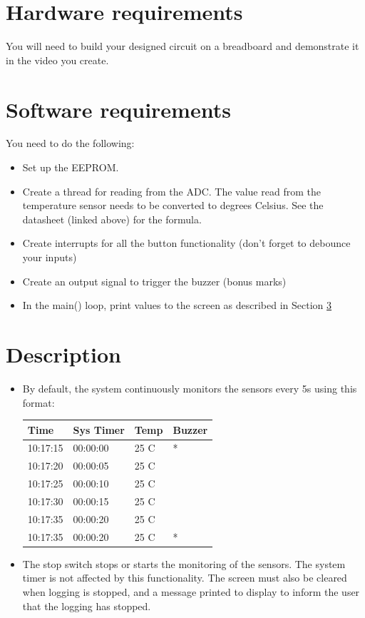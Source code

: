\section{Hardware requirements}
You will need to build your designed circuit on a breadboard and demonstrate it in the video you create.

\section{Software requirements}
You need to do the following:
\begin{itemize}
    \item Set up the EEPROM. 
    \item Create a thread for reading from the ADC. The value read from the temperature sensor needs to be converted to degrees Celsius. See the datasheet (linked above) for the formula.
    \item Create interrupts for all the button functionality (don't forget to debounce your inputs)
    \item Create an output signal to trigger the buzzer (bonus marks)
    \item In the main() loop, print values to the screen as described in Section \ref{sec:ProjDescription}
\end{itemize}

\section{Description}
\label{sec:ProjDescription}
\begin{itemize}
    \item By default, the system continuously monitors the sensors every 5s using this format:
    \begin{table}[H]
    \centering
    \begin{tabular}{|l|l|l|l|}
    \hline
    Time     & Sys Timer & Temp  &  Buzzer  \\ \hline
    10:17:15 & 00:00:00  & 25 C  & *        \\ \hline
    10:17:20 & 00:00:05  & 25 C  &          \\ \hline
    10:17:25 & 00:00:10  & 25 C  &          \\ \hline
    10:17:30 & 00:00:15  & 25 C  &          \\ \hline
    10:17:35 & 00:00:20  & 25 C  &          \\ \hline
    10:17:35 & 00:00:20  & 25 C  & *        \\ \hline
    \end{tabular}
    \end{table}
    \item The stop switch stops or starts the monitoring of the sensors. The system timer is not affected by this functionality. The screen must also be cleared when logging is stopped, and a message printed to display to inform the user that the logging has stopped.
\end{itemize}


